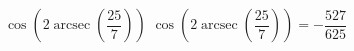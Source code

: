  {$\cos\left(2 \operatorname{arcsec}\left(\dfrac{25}{7}\right)\right)$}
{ $\cos\left(2 \operatorname{arcsec}\left(\dfrac{25}{7}\right)\right) = -\dfrac{527}{625}$}
